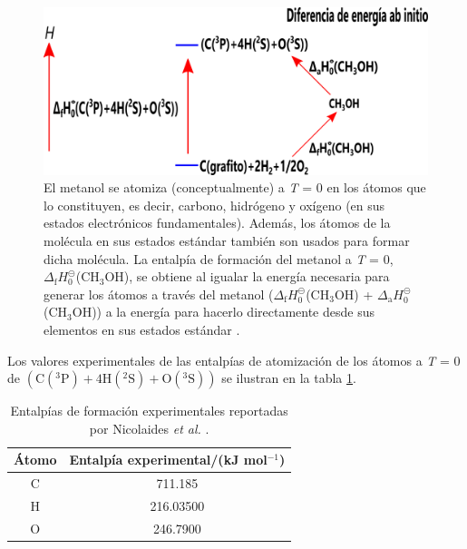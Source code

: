 \begin{figure}[H]
\begin{center}
\includegraphics[scale=.6]{graphs/atomization-CH3OH.png}
	\caption[Figura de entalpía de atomización de metanol.]{El metanol se atomiza (conceptualmente) a \textit{T} = 0 en los átomos que lo constituyen, es decir,  carbono, hidrógeno y oxígeno (en sus estados electrónicos fundamentales). Además, los átomos de la molécula en sus estados estándar también son usados para formar dicha molécula. La entalpía de formación del metanol a \textit{T} = 0, $\Delta_{\mathrm{f}} H^{\circleddash}_{0}$(CH$_3$OH), se obtiene al igualar la energía necesaria para generar los átomos a través del metanol ($ \Delta_{\mathrm{f}} H^{\circleddash}_{0}$(CH$_3$OH) + $ \Delta_\mathrm{{a}} H^{\circleddash}_{0}$(CH$_3$OH)) a la energía para hacerlo directamente desde sus elementos en sus estados estándar \cite{Lewars2016}.}
\label{atm-metanol}
\end{center}
\end{figure}

Los valores experimentales de las entalpías de atomización de los átomos a \textit{T} = 0 de $\mathrm{(C(^{3}P) + 4H(^{2}S) + O(^{3}S))}$ se ilustran en la tabla \ref{Nicolaides-table}.

\begin{table}[H]
\begin{center}
\begin{tabular}{||c|c||}
\hline 
Átomo  & Entalpía experimental/(kJ mol$^{-1}$) \\ 
\hline 
\hline
C & 711.185 \\ 
\hline 
H & 216.03500 \\ 
\hline 
O & 246.7900 \\ 
\hline 
\end{tabular}
	\caption{Entalpías de formación experimentales reportadas por Nicolaides \textit{et al.} \cite{Nicolaides1996}.}
\label{Nicolaides-table}
\end{center}
\end{table}

